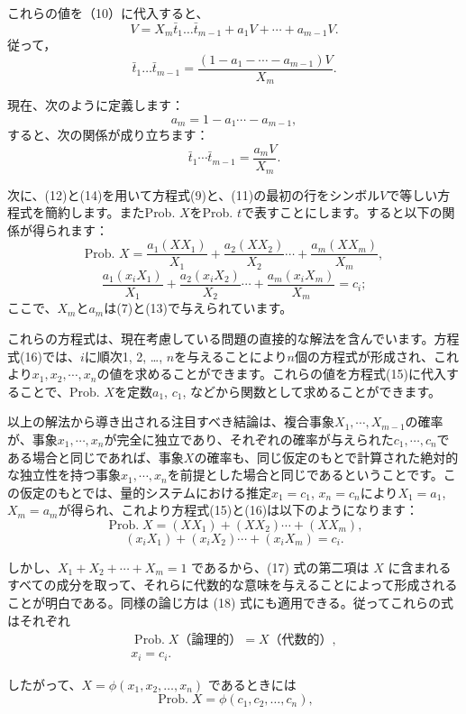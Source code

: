 \documentclass[a4paper,11pt,openany]{ltjsbook}
\begin{document}
これらの値を（10）に代入すると、
\[
  V = X_m \bar{t}_1 \dotsc \bar{t}_{m-1} + a_1 V + \dotsb + a_{m-1} V.
\]
従って，
\[
  \bar{t}_1 \dotsc \bar{t}_{m-1} = \frac{(1 - a_1 - \dotsb - a_{m-1})V}{X_m}.
\]

現在、次のように定義します：
\[
a_m = 1 - a_1 \cdots - a_{m-1},    \tag{13}
\]
すると、次の関係が成り立ちます：
\[
\bar{t}_1 \cdots \bar{t}_{m-1} = \frac{a_m V}{X_m}.   \tag{14}
\]

次に、(12)と(14)を用いて方程式(9)と、(11)の最初の行をシンボル$V$で等しい方程式を簡約します。またProb. $X$をProb. $t$で表すことにします。すると以下の関係が得られます：
\[
\text{Prob. } X
= \frac{a_1(X X_1)}{X_1}
+ \frac{a_2(X X_2)}{X_2} \cdots
+ \frac{a_m(X X_m)}{X_m},             \tag{15}
\]
\[
\frac{a_1(x_i X_1)}{X_1}
+ \frac{a_2(x_i X_2)}{X_2} \cdots
+ \frac{a_m(x_i X_m)}{X_m} = c_i;    \tag{16}
\]
ここで、$X_m$と$a_m$は(7)と(13)で与えられています。

これらの方程式は、現在考慮している問題の直接的な解法を含んでいます。方程式(16)では、$i$に順次1, 2, \dots, $n$を与えることにより$n$個の方程式が形成され、これより$x_1, x_2, \cdots, x_n$の値を求めることができます。これらの値を方程式(15)に代入することで、$\text{Prob. } X$を定数$a_1$, $c_1$, などから関数として求めることができます。

以上の解法から導き出される注目すべき結論は、複合事象$X_1, \cdots, X_{m-1}$の確率が、事象$x_1, \cdots, x_n$が完全に独立であり、それぞれの確率が与えられた$c_1, \cdots, c_n$である場合と同じであれば、事象$X$の確率も、同じ仮定のもとで計算された絶対的な独立性を持つ事象$x_1, \cdots, x_n$を前提とした場合と同じであるということです。この仮定のもとでは、量的システムにおける推定$x_1 = c_1$, $x_n = c_n$により$X_1 = a_1$, $X_m = a_m$が得られ、これより方程式(15)と(16)は以下のようになります：
\[
\operatorname{Prob. } X = (X X_1) + (X X_2) \cdots + (X X_m),    \tag{17}
\]
\[
(x_i X_1) + (x_i X_2) \cdots + (x_i X_m) = c_i.     \tag{18}
\]

しかし、$X_1 + X_2 + \dotsb + X_m = 1$ であるから、(17) 式の第二項は $X$ に含まれるすべての成分を取って、それらに代数的な意味を与えることによって形成されることが明白である。同様の論じ方は (18) 式にも適用できる。従ってこれらの式はそれぞれ
\begin{gather*}
\operatorname{Prob. } X \text{（論理的）} = X \text{（代数的）}, \\
x_i = c_i.
\end{gather*}

したがって、$X = \phi(x_1, x_2, \dotsc, x_n)$ であるときには
\begin{equation*}
\operatorname{Prob. } X = \phi(c_1, c_2, \dotsc, c_n),
\end{equation*}
\end{document}
